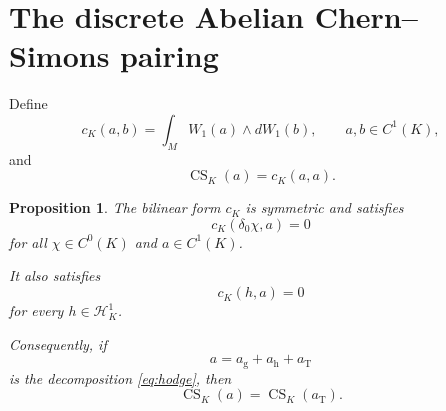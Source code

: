 \documentclass[11pt]{article}
\newtheorem{proposition}[theorem]{Proposition}
\theoremstyle{definition}
\theoremstyle{remark}
\newcommand{\CS}{\operatorname{CS}}
\begin{document}
\section{The discrete Abelian Chern--Simons pairing}

Define
\begin{equation}
c_K(a,b)
=
\int_M
W_1(a)\wedge dW_1(b),
\qquad
a,b\in C^1(K),
\label{eq:pairing}
\end{equation}
and
\begin{equation}
\CS_K(a)
=
c_K(a,a).
\label{eq:cs-definition}
\end{equation}

\begin{proposition}
\label{prop:gauge-harmonic}
The bilinear form \(c_K\) is symmetric and satisfies
\begin{equation}
c_K(\delta_0\chi,a)=0
\label{eq:exact-annihilation}
\end{equation}
for all \(\chi\in C^0(K)\) and \(a\in C^1(K)\).

It also satisfies
\begin{equation}
c_K(h,a)=0
\label{eq:harmonic-annihilation}
\end{equation}
for every \(h\in\mathcal H_K^1\).

Consequently, if
\begin{equation}
a=a_{\mathrm g}+a_{\mathrm h}+a_{\mathrm T}
\end{equation}
is the decomposition \eqref{eq:hodge}, then
\begin{equation}
\CS_K(a)
=
\CS_K(a_{\mathrm T}).
\label{eq:only-transverse}
\end{equation}
\end{proposition}
\end{document}
